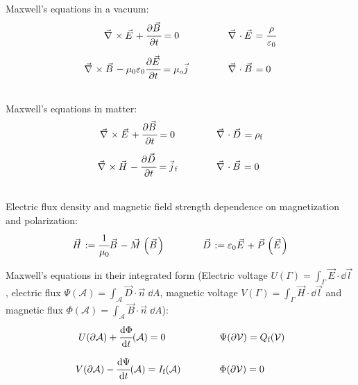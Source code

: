 		\noindent
		Maxwell's equations in a vacuum:
		\begin{equation}
		\begin{array}{rl}
			\vec{\nabla}\times \vec{E} + \cfrac{\partial\vec{B}}{\partial t} = 0 \phantom{\mu_0}
			&\hsp \vec{\nabla}\cdot\vec{E} = \cfrac{\rho}{\varepsilon_0} \\ \xrowht{40pt}
			\vec{\nabla}\times\vec{B} - \mu_0 \varepsilon_0 \cfrac{\partial \vec{E}}{\partial t} = \mu_o\vec{j}
			&\hsp \vec{\nabla}\cdot\vec{B} = 0 \\
		\end{array}
		\end{equation}

		\noindent
		Maxwell's equations in matter:
		\begin{equation}
		\begin{array}{rl}
			\vec{\nabla}\times \vec{E} + \cfrac{\partial\vec{B}}{\partial t} = 0 \phantom{_\text{f}}
			&\hsp \vec{\nabla}\cdot\vec{D} = \rho_\text{f}\\ \xrowht{40pt}
			\vec{\nabla}\times\vec{H} - \cfrac{\partial \vec{D}}{\partial t} = \vec{j}_\text{f}
			&\hsp \vec{\nabla}\cdot\vec{B} = 0 \\
		\end{array}
		\end{equation}

		\noindent
		Electric flux density and magnetic field strength dependence on magnetization and polarization:
		\begin{equation} \label{Eq:FluxDensityFieldStrength}
		\begin{array}{cc}
			\vec{H} := \cfrac{1}{\mu_0}\Vec{B} - \vec{M}\left(\vec{B}\right)
			&\hsp \vec{D} := \varepsilon_0\vec{E} + \vec{P}\left(\vec{E}\right)
		\end{array}
		\end{equation}


		\noindent
		Maxwell's equations in their integrated form (Electric voltage $U(\Gamma)=\int_\Gamma \vec{E}\cdot\dd\vec{l}$, electric flux $\Psi(\mathcal{A})=\int_\mathcal{A}\vec{D}\cdot\vec{n}\;\dd A$, magnetic voltage $V(\Gamma)=\int_\Gamma \vec{H}\cdot\dd\vec{l}$ and magnetic flux $\Phi(\mathcal{A})=\int_\mathcal{A}\vec{B}\cdot\vec{n}\;\dd A$):
		\begin{equation}
		\begin{array}{rl}
			U(\partial \mathcal{A}) + \cfrac{\dd\Phi}{\dd t}(\mathcal{A}) = 0\phantom{(\mathcal{A})}
			&\hsp \Psi(\partial\mathcal{V}) = Q_\text{f}(\mathcal{V}) \\ \xrowht{40pt}
			V(\partial \mathcal{A}) - \cfrac{\dd \Psi}{\dd t}(\mathcal{A}) = I_\text{f}(\mathcal{A})
			&\hsp \Phi(\partial\mathcal{V}) = 0 \\
		\end{array}
		\end{equation}

